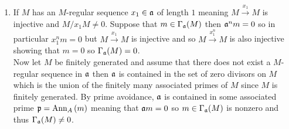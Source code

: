 \documentclass[12pt]{article}
\begin{document}
\begin{enumerate}
\item 
If $M$ has an $M$-regular sequence $x_1 \in \mathfrak{a}$ of length $1$ meaning $M \xrightarrow{x_1} M$ is injective and $M / x_1 M \neq 0$. Suppose that $m \in \Gamma_{\mathfrak{a}}(M)$ then $\mathfrak{a}^n m = 0$ so in particular $x_1^n m = 0$ but $M \xrightarrow{x_1} M$ is injective and so $M \xrightarrow{x_1^n} M$ is also injective showing that $m = 0$ so $\Gamma_{\mathfrak{a}}(M) = 0$. 
\bigskip\\
Now let $M$ be finitely generated and assume that there does not exist a $M$-regular sequence in $\mathfrak{a}$ then $\mathfrak{a}$ is contained in the set of zero divisors on $M$ which is the union of the finitely many associated primes of $M$ since $M$ is finitely generated. By prime avoidance, $\mathfrak{a}$ is contained in some associated prime $\mathfrak{p} = \mathrm{Ann}_{A}\left(m\right)$ meaning that $\mathfrak{a} m = 0$ so $m \in \Gamma_{\mathfrak{a}}(M)$ is nonzero and thus $\Gamma_{\mathfrak{a}}(M) \neq 0$.


\end{enumerate}
\end{document}
